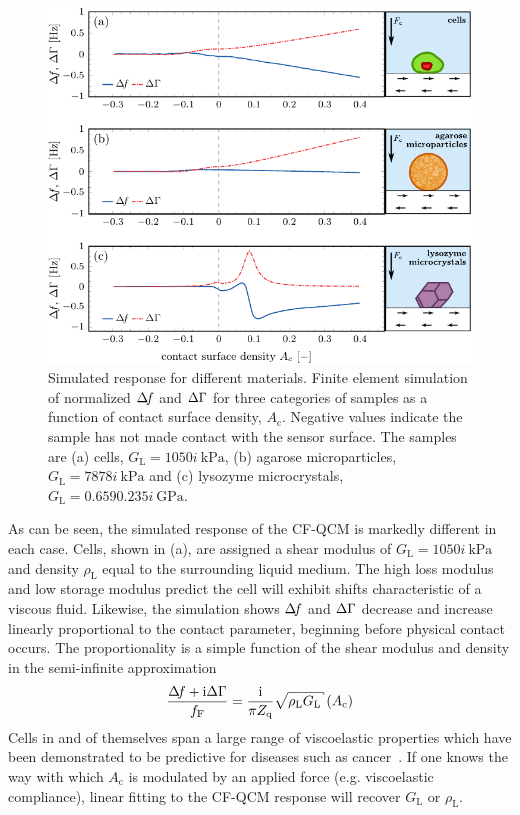 \begin{figure}[ht]
 \centering
\includegraphics{qcm/figures/multisweep.pdf}
\caption{Simulated response for different materials.  Finite element simulation of normalized $\Delta\!f$ and $\Delta\Gamma$ for three
 categories of samples as a function of contact surface density, 
 $A_\mathrm{c}$.
 Negative values indicate the sample has not made contact with the sensor
 surface.
 The samples are (a) cells, $G_\mathrm{L}=\SI{10+50i}{\kilo\pascal}$, (b)
 agarose microparticles, $G_\mathrm{L}=\SI{78+78i}{\kilo\pascal}$ and (c) lysozyme
 microcrystals, $G_\mathrm{L}=\SI{0.659+0.235i}{\giga\pascal}$.  }
\label{fig:multisweep}
\end{figure}

As can be seen, the simulated response of the CF-QCM is markedly different
in each case. Cells, shown in (a), are assigned a
shear modulus of $G_\mathrm{L}=\SI{10+50i}{\kilo\pascal}$ and density
$\rho_\mathrm{L}$ equal to the surrounding liquid medium.  The high loss
modulus and low storage modulus predict the cell will exhibit shifts
characteristic of a viscous fluid.  Likewise, the simulation shows $\Delta\!f$
and $\Delta\Gamma$ decrease and increase linearly proportional to the contact
parameter, beginning before physical contact occurs.  The proportionality
is a simple function of the shear modulus and density in the
semi-infinite approximation~\cite{flanigan2000contact}~\cite{kanazawa1985frequency}
\begin{equation}
 \frac{\df+\mi\dg}{f_\mathrm{F}}=\frac{\mi}{\pi Z_\mathrm{q}}\sqrt{\rho_\mathrm{L} G_\mathrm{L}}
 \left(A_\mathrm{c}\right)
\end{equation}
 Cells in and of
themselves span a large range of viscoelastic properties which have been
demonstrated to be predictive for diseases such as
cancer~\cite{rebelo2013comparison}.  If one knows the way with which
$A_\mathrm{c}$ is modulated by an applied force (e.g. viscoelastic
compliance), linear fitting to
the CF-QCM response will recover $G_\mathrm{L}$ or $\rho_\mathrm{L}$.

